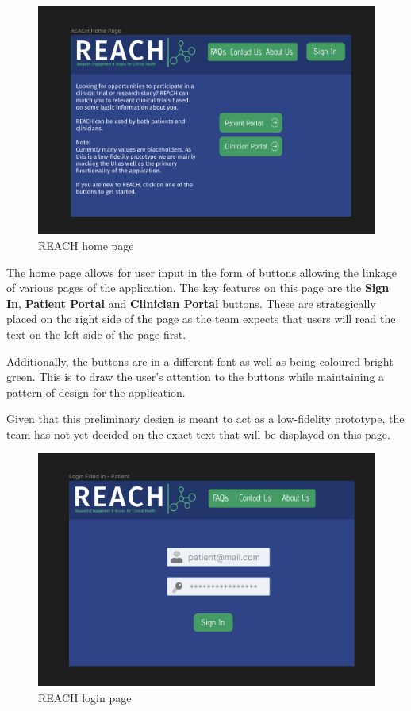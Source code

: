 \documentclass[12pt, titlepage]{article}
\begin{document}
\begin{figure}[H]
  \centering
  \includegraphics[width=0.9\linewidth]{images/HomePage.png}
  \caption{REACH home page}
  \label{fig:figure1}
\end{figure}
The home page allows for user input in the form of buttons allowing the linkage of 
various pages of the application. The key features on this page are the \textbf{Sign In},
\textbf{Patient Portal} and \textbf{Clinician Portal} buttons.
These are strategically placed on the right side of the page as the team expects
that users will read the text on the left side of the page first.\newline

Additionally, the buttons are in a different font as well as being
coloured bright green. This is to draw the user's attention to the buttons
while maintaining a pattern of design for the application. \newline

Given that this preliminary design is meant to act as a low-fidelity prototype, 
the team has not yet decided on the exact text that will be displayed on this page. 


\begin{figure}[H]
  \centering
  \includegraphics[width=0.9\linewidth]{images/Login.png}
  \caption{REACH login page}
  \label{fig:figure2}
\end{figure}
\end{document}
